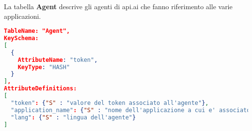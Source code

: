La tabella \textbf{Agent} descrive gli agenti di api.ai che fanno riferimento alle varie applicazioni.
\begin{lstlisting}[language=json,firstnumber=1]
TableName: "Agent",
KeySchema:
[
  {
    AttributeName: "token",
    KeyType: "HASH"
  }
],
AttributeDefinitions:
[
  "token": {"S" : "valore del token associato all'agente"},
  "application_name": {"S" : "nome dell'applicazione a cui e' associato l'agente"},
  "lang": {"S" : "lingua dell'agente"}
]
\end{lstlisting}
